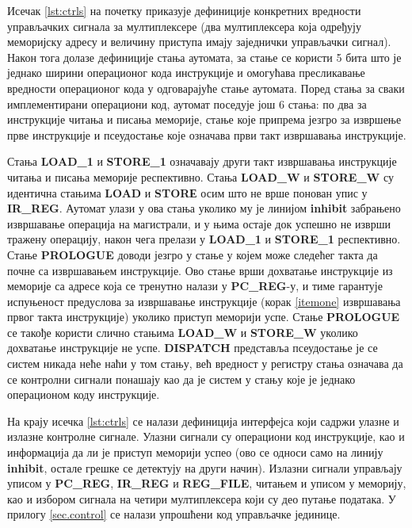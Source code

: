 

Исечак \ref{lst:ctrls} на почетку приказује дефиниције конкретних вредности управљачких сигнала за мултиплексере (два мултиплексера која одређују меморијску адресу и величину приступа имају заједнички управљачки сигнал). Након тога долазе дефиниције стања аутомата, за стање се користи 5 бита што је једнако ширини операционог кода инструкције и омогућава пресликавање вредности операционог кода у одговарајуће стање аутомата. Поред стања за сваки имплементирани операциони код, аутомат поседује још 6 стања: по два за инструкције читања и писања меморије, стање које припрема језгро за извршење прве инструкције и псеудостање које означава први такт извршавања инструкције.

Стања \textbf{LOAD\_1} и \textbf{STORE\_1} означавају други такт извршавања инструкције читања и писања меморије респективно. Стања \textbf{LOAD\_W} и \textbf{STORE\_W} су идентична стањима \textbf{LOAD} и \textbf{STORЕ} осим што не врше понован упис у \textbf{IR\_REG}. Аутомат улази у ова стања уколико му је линијом \textbf{inhibit} забрањено извршавање операција на магистрали, и у њима остаје док успешно не изврши тражену операцију, након чега прелази у \textbf{LOAD\_1} и \textbf{STORE\_1} респективно.
Стање \textbf{PROLOGUE} доводи језгро у стање у којем може следећег такта да почне са извршавањем инструкције. Ово стање врши дохватање инструкције из меморије са адресе која се тренутно налази у \textbf{PC\_REG}-у, и тиме гарантује испуњеност предуслова за извршавање инструкције (корак \ref{itemone} извршавања првог такта инструкције) уколико приступ меморији успе. Стање \textbf{PROLOGUE} се такође користи слично стањима \textbf{LOAD\_W} и \textbf{STORE\_W} уколико дохватање инструкције не успе. \textbf{DISPATCH} представља псеудостање је се систем никада неће наћи у том стању, већ вредност у регистру стања означава да се контролни сигнали понашају као да је систем у стању које је једнако операционом коду инструкције.

На крају исечка \ref{lst:ctrls} се налази дефиниција интерфејса који садржи улазне и излазне контролне сигнале. Улазни сигнали су операциони код инструкције, као и информација да ли је приступ меморији успео (ово се односи само на линију \textbf{inhibit}, остале грешке се детектују на други начин). Излазни сигнали управљају уписом у \textbf{PC\_REG}, \textbf{IR\_REG} и \textbf{REG\_FILE}, читањем и уписом у меморију, као и избором сигнала на четири мултиплексера који су део путање података. У прилогу \ref{sec.control} се налази упрошћени код управљачке јединице.


